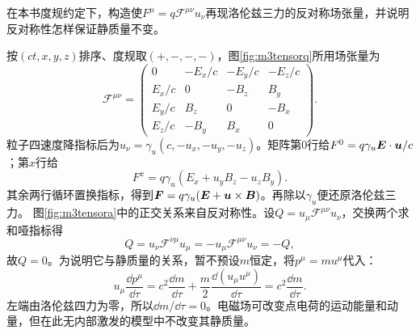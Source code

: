 \begin{example}\label{ex:m3fourtensor}
在本书度规约定下，构造使$F^\mu=q\mathcal F^{\mu\nu}u_\nu$再现洛伦兹三力的反对称场张量，并说明反对称性怎样保证静质量不变。
\end{example}
\begin{solution}
按$(ct,x,y,z)$排序、度规取$(+,-,-,-)$，图\ref{fig:m3tensorq}所用场张量为
\[
 \mathcal F^{\mu\nu}=\begin{pmatrix}
 0&-E_x/c&-E_y/c&-E_z/c\\
 E_x/c&0&-B_z&B_y\\
 E_y/c&B_z&0&-B_x\\
 E_z/c&-B_y&B_x&0
 \end{pmatrix}.
\]
粒子四速度降指标后为$u_\nu=\gamma_u(c,-u_x,-u_y,-u_z)$。矩阵第0行给$F^0=q\gamma_u\bm{E}\cdot\bm{u}/c$；第$x$行给
\[
 F^x=q\gamma_u(E_x+u_yB_z-u_zB_y).
\]
其余两行循环置换指标，得到$\bm{F}=q\gamma_u(\bm{E}+\bm{u}\times\bm{B})$。再除以$\gamma_u$便还原洛伦兹三力。
图\ref{fig:m3tensora}中的正交关系来自反对称性。设$Q=u_\mu\mathcal F^{\mu\nu}u_\nu$，交换两个求和哑指标得
\[
 Q=u_\nu\mathcal F^{\nu\mu}u_\mu
 =-u_\mu\mathcal F^{\mu\nu}u_\nu=-Q,
\]
故$Q=0$。为说明它与静质量的关系，暂不预设$m$恒定，将$p^\mu=mu^\mu$代入：
\[
 u_\mu\frac{\dd p^\mu}{\dd\tau}
 =c^2\frac{\dd m}{\dd\tau}
 +\frac m2\frac{\dd(u_\mu u^\mu)}{\dd\tau}
 =c^2\frac{\dd m}{\dd\tau}.
\]
左端由洛伦兹四力为零，所以$\dd m/\dd\tau=0$。电磁场可改变点电荷的运动能量和动量，但在此无内部激发的模型中不改变其静质量。
\end{solution}
